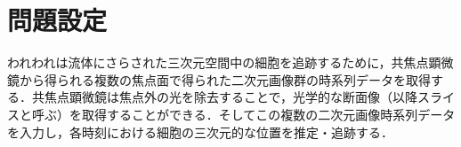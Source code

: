 \section{問題設定}

われわれは流体にさらされた三次元空間中の細胞を追跡するために，共焦点顕微鏡から得られる複数の焦点面で得られた二次元画像群の時系列データを取得する．共焦点顕微鏡は焦点外の光を除去することで，光学的な断面像（以降スライスと呼ぶ）を取得することができる．そしてこの複数の二次元画像時系列データを入力し，各時刻における細胞の三次元的な位置を推定・追跡する．